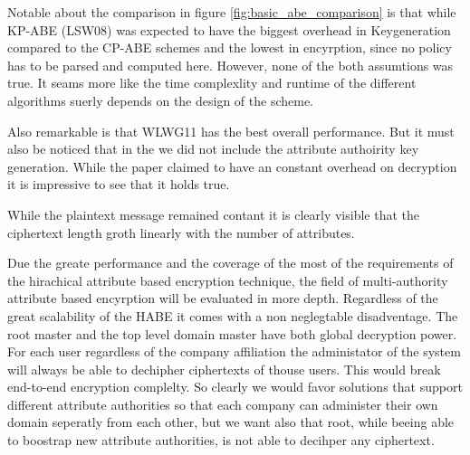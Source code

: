 Notable about the comparison in figure \ref{fig:basic_abe_comparison} is that while \ac{KP-ABE} (LSW08) was expected to have the biggest overhead in Keygeneration compared to the \ac{CP-ABE} schemes and the lowest in encyrption, since no policy has to be parsed and computed here. However, none of the both assumtions was true. It seams more like the time complexlity and runtime of the different algorithms suerly depends on the design of the scheme. 

Also remarkable is that WLWG11 has the best overall performance. But it must also be noticed that in the we did not include the attribute authoirity key generation. While the paper claimed to have an constant overhead on decryption it is impressive to see that it holds true. 

While the plaintext message remained contant it is clearly visible that the ciphertext length groth linearly with the number of attributes. 

Due the greate performance and the coverage of the most of the requirements of the hirachical attribute based encryption technique, the field of multi-authority attribute based encyrption will be evaluated in more depth. Regardless of the great scalability of the \ac{HABE} it comes with a non neglegtable disadventage. The root master and the top level domain master have both global decryption power. For each user regardless of the company affiliation the administator of the system will always be able to dechipher ciphertexts of thouse users. This would break end-to-end encryption complelty. So clearly we would favor solutions that support different attribute authorities so that each company can administer their own domain seperatly from each other, but we want also that root, while beeing able to boostrap new attribute authorities, is not able to decihper any ciphertext. 


